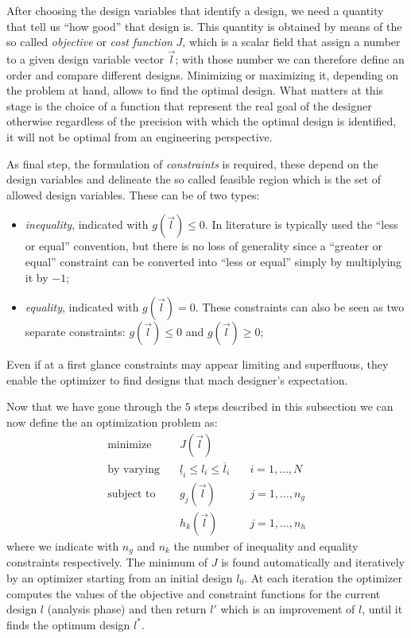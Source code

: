 \smallskip
After choosing the design variables that identify a design, we need a quantity that tell us ``how good'' that design is. This quantity is obtained by means of the so called \emph{objective} or \emph{cost function} $J$, which is a scalar field that assign a number to a given design variable vector $\vec{l}$; with those number we can therefore define an order and compare different designs. Minimizing or maximizing it, depending on the problem at hand, allows to find the optimal design. What matters at this stage is the choice of a function that represent the real goal of the designer otherwise regardless of the precision with which the optimal design is identified, it will not be optimal from an engineering perspective.

\smallskip
As final step, the formulation of \emph{constraints} is required, these depend on the design variables and delineate the so called feasible region which is the set of allowed design variables. These can be of two types:
\begin{itemize}
	\item \emph{inequality}, indicated with $g(\vec{l}) \le 0$. In literature is typically used the ``less or equal'' convention, but there is no loss of generality since a ``greater or equal'' constraint can be converted into ``less or equal'' simply by multiplying it by $-1$;
	\item \emph{equality}, indicated with $g(\vec{l}) = 0$. These constraints can also be seen as two separate constraints: $g(\vec{l}) \le 0$ and $g(\vec{l}) \ge 0$;
\end{itemize}
Even if at a first glance constraints may appear limiting and superfluous, they enable the optimizer to find designs that mach designer's expectation.

\medskip
Now that we have gone through the $5$ steps described in this subsection we can now define the an optimization problem as:
\begin{equation}
\begin{aligned}
	\text{minimize}   & \quad J(\vec{l})														   \\
	\text{by varying} & \quad \underline{l}_i \le l_i \le \overline{l}_i  & \quad i=1, \dots, N    \\
	\text{subject to} & \quad g_j(\vec{l})								  & \quad j=1, \dots, n_g  \\
					  & \quad h_k(\vec{l})								  & \quad j=1, \dots, n_h
\end{aligned}
\end{equation}
where we indicate with $n_g$ and $n_k$ the number of inequality and equality constraints respectively.
The minimum of $J$ is found automatically and iteratively by an optimizer starting from an initial design $l_0$. At each iteration the optimizer computes the values of the objective and constraint functions for the current design $l$ (analysis phase) and then return $l'$ which is an improvement of $l$, until it finds the optimum design $l^*$.


